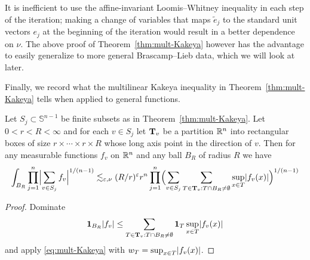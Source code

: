 It is inefficient to use the affine-invariant Loomis--Whitney inequality in each step of the iteration; making a change of variables that maps $\tilde{e}_{j}$ to the standard unit vectors $e_{j}$ at the beginning of the iteration would result in a better dependence on $\nu$.
The above proof of Theorem~\ref{thm:mult-Kakeya} however has the advantage to easily generalize to more general Brascamp--Lieb data, which we will look at later.

Finally, we record what the multilinear Kakeya inequality in Theorem~\ref{thm:mult-Kakeya} tells when applied to general functions.
\begin{corollary}\label{cor:mult-Kakeya:functions}
Let $S_{j} \subset \mathbb{S}^{n-1}$ be finite subsets as in Theorem~\ref{thm:mult-Kakeya}.
Let $0<r<R<\infty$ and for each $v \in S_{j}$ let $\Tubes_{v}$ be a partition $\R^{n}$ into rectangular boxes of size $r \times \dotsm \times r \times R$ whose long axis point in the direction of $v$.
Then for any measurable functions $f_{v}$ on $\R^{n}$ and any ball $B_{R}$ of radius $R$ we have
\[
\int_{B_{R}} \prod_{j=1}^{n} \abs[\Big]{\sum_{v\in S_{j}} f_{v}}^{1/(n-1)}
\lesssim_{\epsilon,\nu} (R/r)^{\epsilon} r^{n}
\prod_{j=1}^{n} \Bigl( \sum_{v\in S_{j}} \sum_{T\in \Tubes_{v} : T\cap B_{R} \neq \emptyset} \sup_{x \in T} \abs{f_{v}(x)} \Bigr)^{1/(n-1)}
\]
\end{corollary}
\begin{proof}
Dominate
\[
\one_{B_{R}}\abs{f_{v}} \leq
\sum_{T\in \Tubes_{v} : T\cap B_{R} \neq \emptyset} \one_{T} \sup_{x \in T} \abs{f_{v}(x)}
\]
and apply \eqref{eq:mult-Kakeya} with $w_{T} = \sup_{x \in T} \abs{f_{v}(x)}$.
\end{proof}

